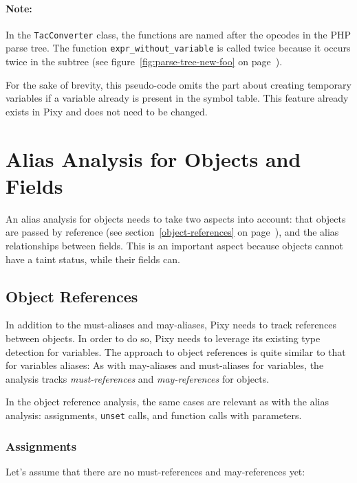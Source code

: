 \paragraph{Note:} In the \texttt{TacConverter} class, the functions are named after the opcodes in the PHP parse tree. The function \texttt{expr\_without\_variable} is called twice because it occurs twice in the subtree (see figure~\ref{fig:parse-tree-new-foo} on page~\pageref{fig:parse-tree-new-foo}).

For the sake of brevity, this pseudo-code omits the part about creating temporary variables if a variable already is present in the symbol table. This feature already exists in Pixy and does not need to be changed.


\section{Alias Analysis for Objects and Fields}

An alias analysis for objects needs to take two aspects into account: that objects are passed by reference (see section~\ref{object-references} on page~\pageref{object-references}), and the alias relationships between fields. This is an important aspect because objects cannot have a taint status, while their fields can.


\subsection{Object References}

In addition to the must-aliases and may-aliases, Pixy needs to track references between objects. In order to do so, Pixy needs to leverage its existing type detection for variables. The approach to object references is quite similar to that for variables aliases: As with may-aliases and must-aliases for variables, the analysis tracks \emph{must-references} and \emph{may-references} for objects.

In the object reference analysis, the same cases are relevant as with the alias analysis: assignments, \texttt{unset} calls, and function calls with parameters.


\subsubsection{Assignments}

Let's assume that there are no must-references and may-references yet:

